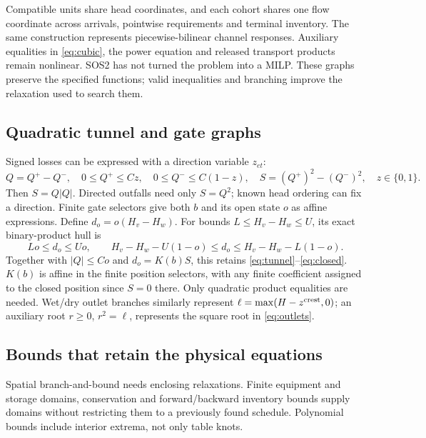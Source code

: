 \documentclass[10pt,a4paper]{article}
\begin{document}
Compatible units share head coordinates, and each cohort shares one flow
coordinate across arrivals, pointwise requirements and terminal inventory.
The same construction represents piecewise-bilinear channel responses.
Auxiliary equalities in \eqref{eq:cubic}, the power equation and released
transport products remain nonlinear. SOS2 has not turned the problem into
a MILP. These graphs preserve the specified functions; valid inequalities
and branching improve the relaxation used to search them.

\subsection{Quadratic tunnel and gate graphs}

Signed losses can be expressed with a direction variable $z_{et}$:
\begin{equation}
Q=Q^+-Q^-,\quad
0\le Q^+\le Cz,\quad 0\le Q^-\le C(1-z),\quad
S=(Q^+)^2-(Q^-)^2,\quad z\in\{0,1\}.
\label{eq:signedloss}
\end{equation}
Then $S=Q|Q|$. Directed outfalls need only $S=Q^2$; known head ordering
can fix a direction. Finite gate selectors give both $b$ and its open
state $o$ as affine expressions. Define $d_o=o(H_v-H_w)$.
For bounds $L\le H_v-H_w\le U$, its exact binary-product hull is
\begin{equation}
Lo\le d_o\le Uo,\qquad
H_v-H_w-U(1-o)\le d_o\le H_v-H_w-L(1-o).
\label{eq:binaryhull}
\end{equation}
Together with $|Q|\le Co$ and $d_o=K(b)S$, this retains
\eqref{eq:tunnel}--\eqref{eq:closed}. $K(b)$ is affine in the
finite position selectors, with any finite coefficient assigned to the
closed position since $S=0$ there. Only quadratic product equalities are
needed. Wet/dry outlet branches similarly represent
$\ell=\max(H-z^{\rm crest},0)$; an auxiliary root $r\ge0$, $r^2=\ell$,
represents the square root in \eqref{eq:outlets}.

\subsection{Bounds that retain the physical equations}

Spatial branch-and-bound needs enclosing relaxations. Finite equipment and
storage domains, conservation and forward/backward inventory bounds supply
domains without restricting them to a previously found schedule.
Polynomial bounds include interior extrema, not only table knots.
\end{document}
